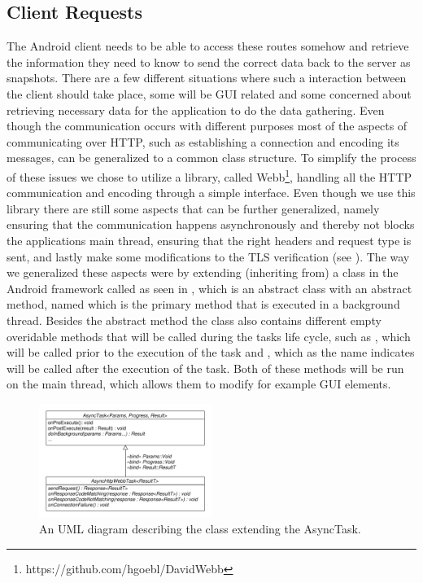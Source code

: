 \subsection{Client Requests}
\label{sub:client_requests}
The Android client needs to be able to access these routes somehow and retrieve the information they need to know to send the correct data back to the server as snapshots. There are a few different situations where such a interaction between the client should take place, some will be GUI related and some concerned about retrieving necessary data for the application to do the data gathering. Even though the communication occurs with different purposes most of the aspects of communicating over HTTP, such as establishing a connection and encoding its messages, can be generalized to a common class structure. To simplify the process of these issues we chose to utilize a library, called Webb\footnote{https://github.com/hgoebl/DavidWebb}, handling all the HTTP communication and encoding through a simple interface. Even though we use this library there are still some aspects that can be further generalized, namely ensuring that the communication happens asynchronously and thereby not blocks the applications main thread, ensuring that the right headers and request type is sent, and lastly make some modifications to the TLS verification (see ). The way we generalized these aspects were by extending (inheriting from) a class in the Android framework called  as seen in , which is an abstract class with an abstract method, named  which is the primary method that is executed in a background thread. Besides the abstract method the class also contains different empty overidable methods that will be called during the tasks life cycle, such as , which will be called prior to the execution of the task and , which as the name indicates will be called after the execution of the task. Both of these methods will be run on the main thread, which allows them to modify for example GUI elements. 

\begin{figure}[!htbp]
    \centering
    \includegraphics[width=0.5\textwidth]{graphic/architecture/async_http_webb_task.pdf}
    \caption{An UML diagram describing the class extending the AsyncTask.}
    \label{fig:async_http_webb_task}
\end{figure}
\FloatBarrier

